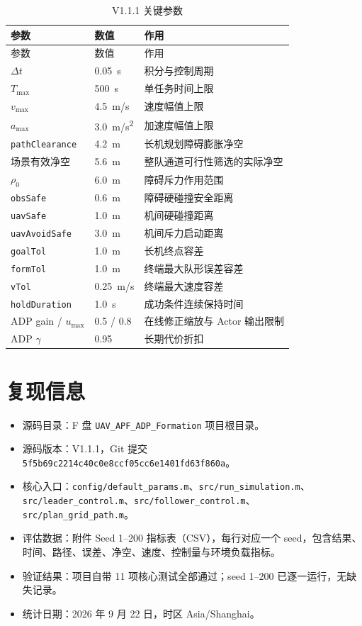 \documentclass[UTF8,a4paper,12pt,fontset=windows]{ctexart}
\newcommand{\code}[1]{\texttt{#1}}
\begin{document}
\begin{longtable}{@{}lC{3.0cm}p{8.0cm}@{}}
\caption{V1.1.1 关键参数}\label{tab:parameters}\\
\toprule
参数 & 数值 & 作用 \\
\midrule
\endfirsthead
\toprule
参数 & 数值 & 作用 \\
\midrule
\endhead
$\Delta t$ & \SI{0.05}{s} & 积分与控制周期 \\
$T_{\max}$ & \SI{500}{s} & 单任务时间上限 \\
$v_{\max}$ & \SI{4.5}{m/s} & 速度幅值上限 \\
$a_{\max}$ & \SI{3.0}{m/s^2} & 加速度幅值上限 \\
\code{pathClearance} & \SI{4.2}{m} & 长机规划障碍膨胀净空 \\
场景有效净空 & \SI{5.6}{m} & 整队通道可行性筛选的实际净空 \\
$\rho_0$ & \SI{6.0}{m} & 障碍斥力作用范围 \\
\code{obsSafe} & \SI{0.6}{m} & 障碍硬碰撞安全距离 \\
\code{uavSafe} & \SI{1.0}{m} & 机间硬碰撞距离 \\
\code{uavAvoidSafe} & \SI{3.0}{m} & 机间斥力启动距离 \\
\code{goalTol} & \SI{1.0}{m} & 长机终点容差 \\
\code{formTol} & \SI{1.0}{m} & 终端最大队形误差容差 \\
\code{vTol} & \SI{0.25}{m/s} & 终端最大速度容差 \\
\code{holdDuration} & \SI{1.0}{s} & 成功条件连续保持时间 \\
ADP gain / $u_{\max}$ & 0.5 / 0.8 & 在线修正缩放与 Actor 输出限制 \\
ADP $\gamma$ & 0.95 & 长期代价折扣 \\
\bottomrule
\end{longtable}

\begingroup
\small
{}
\section{复现信息}

\begin{itemize}
  \item 源码目录：F 盘 \nolinkurl{UAV_APF_ADP_Formation} 项目根目录。
  \item 源码版本：V1.1.1，Git 提交 \code{5f5b69c2214c40c0e8ccf05cc6e1401fd63f860a}。
  \item 核心入口：\nolinkurl{config/default_params.m}、\nolinkurl{src/run_simulation.m}、\\
  \nolinkurl{src/leader_control.m}、\nolinkurl{src/follower_control.m}、\nolinkurl{src/plan_grid_path.m}。
  \item 评估数据：附件 Seed 1--200 指标表（CSV），每行对应一个 seed，包含结果、时间、路径、误差、净空、速度、控制量与环境负载指标。
  \item 验证结果：项目自带 11 项核心测试全部通过；seed 1--200 已逐一运行，无缺失记录。
  \item 统计日期：2026 年 9 月 22 日，时区 Asia/Shanghai。
\end{itemize}
\end{document}

